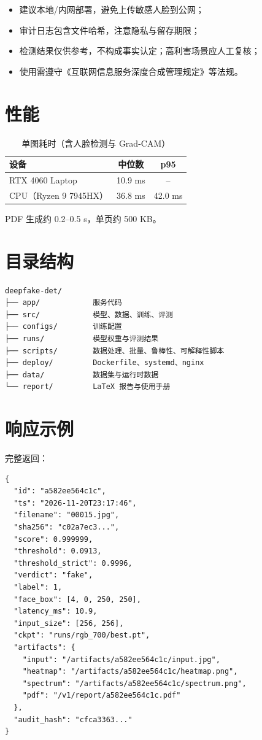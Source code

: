 \documentclass[12pt,a4paper]{article}
\begin{document}
\begin{itemize}
  \item 建议本地/内网部署，避免上传敏感人脸到公网；
  \item 审计日志包含文件哈希，注意隐私与留存期限；
  \item 检测结果仅供参考，不构成事实认定；高利害场景应人工复核；
  \item 使用需遵守《互联网信息服务深度合成管理规定》等法规。
\end{itemize}

\section{性能}

\begin{table}[H]
\centering
\caption{单图耗时（含人脸检测与 Grad-CAM）}
\small
\begin{tabular}{lcc}
\toprule
设备 & 中位数 & p95 \\
\midrule
RTX 4060 Laptop & 10.9 ms & -- \\
CPU（Ryzen 9 7945HX） & 36.8 ms & 42.0 ms \\
\bottomrule
\end{tabular}
\end{table}

PDF 生成约 0.2--0.5 s，单页约 500 KB。

\appendix
\section{目录结构}

\begin{lstlisting}
deepfake-det/
├── app/            服务代码
├── src/            模型、数据、训练、评测
├── configs/        训练配置
├── runs/           模型权重与评测结果
├── scripts/        数据处理、批量、鲁棒性、可解释性脚本
├── deploy/         Dockerfile、systemd、nginx
├── data/           数据集与运行时数据
└── report/         LaTeX 报告与使用手册
\end{lstlisting}

\section{响应示例}

完整返回：

\begin{lstlisting}
{
  "id": "a582ee564c1c",
  "ts": "2026-11-20T23:17:46",
  "filename": "00015.jpg",
  "sha256": "c02a7ec3...",
  "score": 0.999999,
  "threshold": 0.0913,
  "threshold_strict": 0.9996,
  "verdict": "fake",
  "label": 1,
  "face_box": [4, 0, 250, 250],
  "latency_ms": 10.9,
  "input_size": [256, 256],
  "ckpt": "runs/rgb_700/best.pt",
  "artifacts": {
    "input": "/artifacts/a582ee564c1c/input.jpg",
    "heatmap": "/artifacts/a582ee564c1c/heatmap.png",
    "spectrum": "/artifacts/a582ee564c1c/spectrum.png",
    "pdf": "/v1/report/a582ee564c1c.pdf"
  },
  "audit_hash": "cfca3363..."
}
\end{lstlisting}
\end{document}
